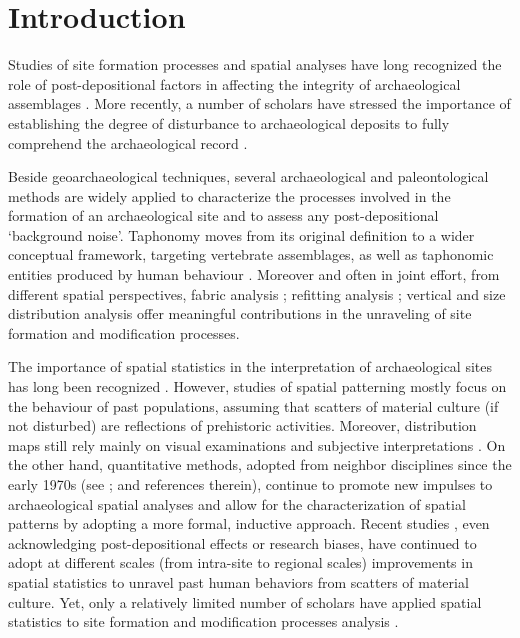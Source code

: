 \documentclass[review,authoryear]{elsarticle} %
\begin{document}
\linenumbers

\section{Introduction}

Studies of site formation processes and spatial analyses have long recognized the role of post-depositional factors in affecting the integrity of archaeological assemblages \citep{Hodder1976,Petraglia1987,Schick1984,Schick1986,Schiffer1972,Schiffer1983,Schiffer1987,Wood1978}. More recently, a number of scholars have stressed the importance of establishing the degree of disturbance to archaeological deposits to fully comprehend the archaeological record \citep{Dibble1997,Djindjian1999,Texier2000}.

Beside geoarchaeological techniques, several archaeological and paleontological methods are widely applied to characterize the processes involved in the formation of an archaeological site and to assess any post-depositional ‘background noise’. Taphonomy moves from its original definition \citep{Efremov1940} to a wider conceptual framework, targeting vertebrate assemblages, as well as taphonomic entities produced by human behaviour \citep{Dominguez-Rodrigo2011}. Moreover and often in joint effort, from different spatial perspectives, fabric analysis \citep{Benito-Calvo2011,Bernatchez2010,Bertran1997,Bertran1995,Dominguez-Rodrigo2014,Lenoble2004,McPherron2005,Torre2013a}; refitting analysis \citep{Lopez-Ortega2011,Sisk2008,Villa1982}; vertical \citep{Anderson2008} and size distribution analysis \citep{Bertran2006,Bertran2012,Petraglia1994} offer meaningful contributions in the unraveling of site formation and modification processes.

The importance of spatial statistics in the interpretation of archaeological sites has long been recognized \citep{Hodder1976,Whallon1974}. However, studies of spatial patterning mostly focus on the behaviour of past populations, assuming that scatters of material culture (if not disturbed) are reflections of prehistoric activities. Moreover, distribution maps still rely mainly on visual examinations and subjective interpretations \citep{Bevan2013a}. On the other hand, quantitative methods, adopted from neighbor disciplines since the early 1970s (see \cite{Hodder1976,Orton1982}; and references therein), continue to promote new impulses to archaeological spatial analyses and allow for the characterization of spatial patterns by adopting a more formal, inductive approach. Recent studies \citep{Bevan2006,Bevan2009,Bevan2013c,Bevan2013a,Bevan2013,Crema2015,Crema2010,Crema2013,Eve2014,Orton2004}, even acknowledging post-depositional effects or research biases, have continued to adopt at different scales (from intra-site to regional scales) improvements in spatial statistics to unravel past human behaviors from scatters of material culture. Yet, only a relatively limited number of scholars have applied spatial statistics to site formation and modification processes analysis \citep{Carrer2015,Dominguez-Rodrigo2014b,Dominguez-Rodrigo2014c}.
\end{document}
